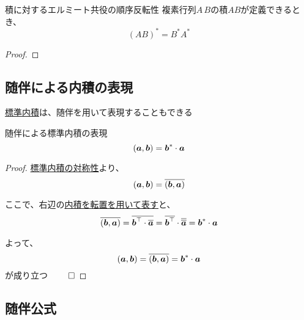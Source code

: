 \documentclass[../../../topic_linear-algebra]{subfiles}
\begin{document}
\br

\begin{theorem}{積に対するエルミート共役の順序反転性}\label{thm:adjoint-of-product}
  複素行列$A\,B$の積$AB$が定義できるとき、
  \begin{equation*}
    (AB)^* = B^* A^*
  \end{equation*}
\end{theorem}

\begin{proof}
  \todo{}
\end{proof}

\subsection{随伴による内積の表現}

\hyperref[def:standard-inner-product-Cn]{標準内積}は、随伴を用いて表現することもできる

\begin{theorem}{随伴による標準内積の表現}\label{thm:inner-product-adjoint-form}
  \begin{equation*}
    (\vb*{a},\vb*{b}) = \vb*{b}^* \cdot \vb*{a}
  \end{equation*}
\end{theorem}

\begin{proof}
  \hyperref[thm:standard-inner-product-symmetry]{標準内積の対称性}より、
  \begin{equation*}
    (\vb*{a},\vb*{b}) = \overline{(\vb*{b},\vb*{a})}
  \end{equation*}

  ここで、右辺の\hyperref[thm:inner-product-as-transpose-product]{内積を転置を用いて表す}と、
  \begin{equation*}
    \overline{(\vb*{b},\vb*{a})} = \overline{\vb*{b}^\top \cdot \overline{\vb*{a}}} = \overline{\vb*{b}^\top} \cdot \overline{\overline{\vb*{a}}} = \vb*{b}^* \cdot \vb*{a}
  \end{equation*}

  よって、
  \begin{equation*}
    (\vb*{a},\vb*{b}) = \overline{(\vb*{b},\vb*{a})} = \vb*{b}^* \cdot \vb*{a}
  \end{equation*}
  が成り立つ $\qed$
\end{proof}

\subsection{随伴公式}
\end{document}
